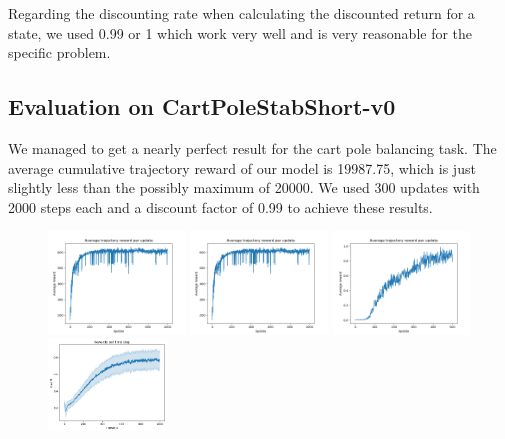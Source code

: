 Regarding the discounting rate when calculating the discounted return for a state, we used 0.99 or 1 which work very well and is very reasonable for the specific problem.

\subsection{Evaluation on CartPoleStabShort-v0}

We managed to get a nearly perfect result for the cart pole balancing task. The average cumulative trajectory reward of our model is 19987.75, which is just slightly less than the possibly maximum of 20000. We used 300 updates with 2000 steps each and a discount factor of 0.99 to achieve these results.

\begin{figure}
	\begin{center}
		\includegraphics[width=0.325\textwidth]{plots/NAC_BB_training_mean_600.png}
		\includegraphics[width=0.325\textwidth]{plots/NAC_BB_training_mean_600.png}
		\includegraphics[width=0.325\textwidth]{plots/NAC_Qube_mean_traj_update_reward.png}
		\includegraphics[width=0.28\textwidth]{plots/NAC_BBtime_step_reward.png}	

\end{center}
\end{figure}
